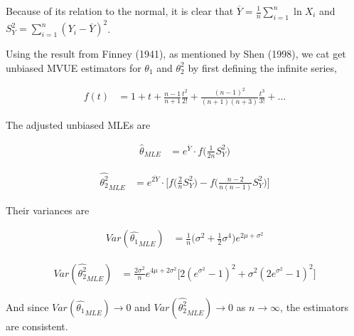 Because of its relation to the normal, it is clear that $\overline{Y} = \frac{1}{n}\sum_{i = 1}^n \ln{X_i}$ and $S_Y^2 = \sum_{i = 1}^n (Y_i - \overline{Y})^2$. 

Using the result from Finney (1941), as mentioned by Shen (1998), we cat get unbiased MVUE estimators for $\theta_1$ and $\theta_2^2$ by first defining the infinite series, 

\begin{equation}
\begin{split}
    f(t) &= 1 + t + \frac{n - 1}{n + 1} \frac{t^2}{2!} + \frac{(n - 1)^2}{(n + 1)(n + 3)} \frac{t^3}{3!} + \hdots
\end{split}
\end{equation}

The adjusted unbiased MLEs are

\begin{equation}
\begin{split}
    \hat{\theta}_{MLE} &= e^{\overline{Y}} \cdot f\bigg(\frac{1}{2n} S_Y^2 \bigg)
\end{split}
\end{equation}

\begin{equation}
\begin{split}
    \hat{\theta_2^2}_{MLE} &= e^{\overline{2Y}} \cdot \bigg[f\bigg(\frac{2}{n} S_Y^2 \bigg) - f\bigg( \frac{n - 2}{n(n - 1)} S_Y^2\bigg) \bigg]
\end{split}
\end{equation}

Their variances are 

\begin{equation}
\begin{split}
    Var(\hat{\theta_1}_{MLE}) &= \frac{1}{n} \bigg(\sigma^2 + \frac{1}{2} \sigma^4 \bigg) e^{2 \mu + \sigma^2}
\end{split}
\end{equation}

\begin{equation}
\begin{split}
    Var(\hat{\theta_2^2}_{MLE}) &= \frac{2 \sigma^2}{n} e^{4 \mu + 2 \sigma^2} 
    \bigg[ 
        2 (e^{\sigma^2} - 1)^2 + \sigma^2 (2 e^{\sigma^2} - 1)^2
    \bigg]
\end{split}
\end{equation}

And since $Var(\hat{\theta_1}_{MLE}) \rightarrow 0$ and $Var(\hat{\theta_2^2}_{MLE}) \rightarrow 0$ as $n \rightarrow \infty$, the estimators are consistent.  \cite{Finney} \cite{Shen}


